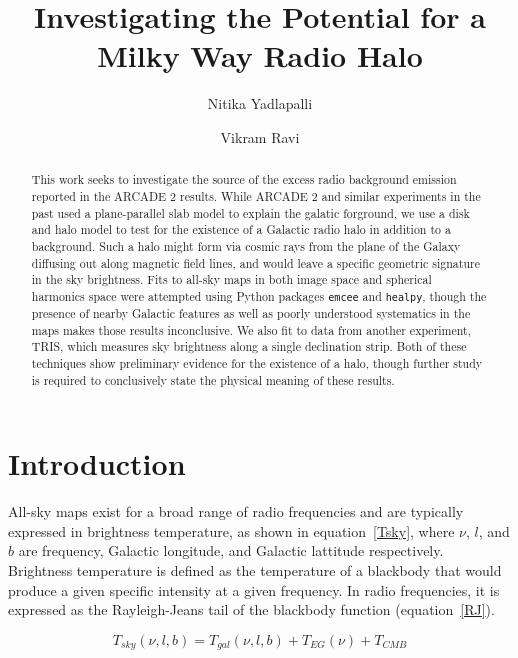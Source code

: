 \documentclass[%
onecolumn,
11pt,
tightenlines,
notitlepage,
superscriptaddress,
nofootinbib,
amsmath,amssymb,
aps,
pra,
]{revtex4-1}
\begin{document}
\title{Investigating the Potential for a Milky Way Radio Halo}
\author{Nitika Yadlapalli}
\author{Vikram Ravi}


\begin{abstract}
\vspace{2mm}
This work seeks to investigate the source of the excess radio background emission reported in the ARCADE 2 results. While ARCADE 2 and similar experiments in the past used a plane-parallel slab model to explain the galatic forground, we use a disk and halo model to test for the existence of a Galactic radio halo in addition to a background. Such a halo might form via cosmic rays from the plane of the Galaxy diffusing out along magnetic field lines, and would leave a specific geometric signature in the sky brightness. Fits to all-sky maps in both image space and spherical harmonics space were attempted using Python packages \texttt{emcee} and \texttt{healpy}, though the presence of nearby Galactic features as well as poorly understood systematics in the maps makes those results inconclusive. We also fit to data from another experiment, TRIS, which measures sky brightness along a single declination strip. Both of these techniques show preliminary evidence for the existence of a halo, though further study is required to conclusively state the physical meaning of these results.

\end{abstract}

\maketitle

\section{Introduction}
All-sky maps exist for a broad range of radio frequencies and are typically expressed in brightness temperature, as shown in equation~\ref{Tsky}, where $\nu$, $l$, and $b$ are frequency, Galactic longitude, and Galactic lattitude respectively. Brightness temperature is defined as the temperature of a blackbody that would produce a given specific intensity at a given frequency. In radio frequencies, it is expressed as the Rayleigh-Jeans tail of the blackbody function (equation~\ref{RJ}).

\begin{equation}
T_{sky}\left(\nu,l,b\right) = T_{gal}\left(\nu,l,b\right) + T_{EG}\left(\nu\right) + T_{CMB}
\label{Tsky}
\end{equation}
\end{document}

